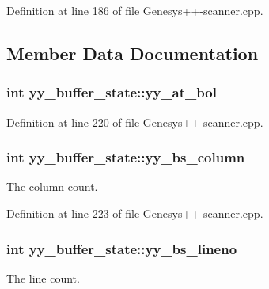 Definition at line 186 of file Genesys++-\/scanner.\-cpp.



\subsection{Member Data Documentation}
\hypertarget{structyy__buffer__state_a9d60c60af6e1a6f69de16871fd64f85f}{
\subsubsection[{yy\-\_\-at\-\_\-bol}]{\setlength{\rightskip}{0pt plus 5cm}int yy\-\_\-buffer\-\_\-state\-::yy\-\_\-at\-\_\-bol}}\label{structyy__buffer__state_a9d60c60af6e1a6f69de16871fd64f85f}


Definition at line 220 of file Genesys++-\/scanner.\-cpp.

\hypertarget{structyy__buffer__state_a10c4fcd8be759e6bf11e6d3e8cdb0307}{
\subsubsection[{yy\-\_\-bs\-\_\-column}]{\setlength{\rightskip}{0pt plus 5cm}int yy\-\_\-buffer\-\_\-state\-::yy\-\_\-bs\-\_\-column}}\label{structyy__buffer__state_a10c4fcd8be759e6bf11e6d3e8cdb0307}
The column count. 

Definition at line 223 of file Genesys++-\/scanner.\-cpp.

\hypertarget{structyy__buffer__state_a818e94bc9c766e683c60df1e9fd01199}{
\subsubsection[{yy\-\_\-bs\-\_\-lineno}]{\setlength{\rightskip}{0pt plus 5cm}int yy\-\_\-buffer\-\_\-state\-::yy\-\_\-bs\-\_\-lineno}}\label{structyy__buffer__state_a818e94bc9c766e683c60df1e9fd01199}
The line count. 

